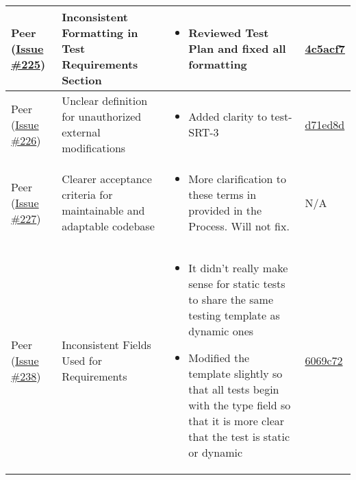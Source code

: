 \documentclass{article}
\begin{document}
\begin{longtable}{|p{2cm}|p{3.5cm}|p{4.5cm}|p{3cm}|}
    Peer (\href{https://github.com/ssm-lab/capstone--source-code-optimizer/issues/225}{Issue \#225}) & 
    Inconsistent Formatting in Test Requirements Section &
    \begin{itemize}[nosep,leftmargin=*]
        \item Reviewed Test Plan and fixed all formatting
    \end{itemize} &
    \href{https://github.com/ssm-lab/capstone--source-code-optimizer/commit/4c5acf71d8f5a05b33241a9b08d3c1c1525a57ae}{4c5acf7} \\
    \hline
    
    Peer (\href{https://github.com/ssm-lab/capstone--source-code-optimizer/issues/226}{Issue \#226}) & 
    Unclear definition for unauthorized external modifications &
    \begin{itemize}[nosep,leftmargin=*]
        \item Added clarity to test-SRT-3
    \end{itemize} &
    \href{https://github.com/ssm-lab/capstone--source-code-optimizer/commit/d71ed8d06018c96abd1e1d932fe8687a835da713}{d71ed8d} \\
    \hline
    
    Peer (\href{https://github.com/ssm-lab/capstone--source-code-optimizer/issues/227}{Issue \#227}) & 
    Clearer acceptance criteria for maintainable and adaptable codebase &
    \begin{itemize}[nosep,leftmargin=*]
        \item More clarification to these terms in provided in the Process. Will not fix.
    \end{itemize} &
    N/A \\
    \hline
    
    Peer (\href{https://github.com/ssm-lab/capstone--source-code-optimizer/issues/238}{Issue \#238}) & 
    Inconsistent Fields Used for Requirements &
    \begin{itemize}[nosep,leftmargin=*]
        \item It didn't really make sense for static tests to share the same testing template as dynamic ones
        \item Modified the template slightly so that all tests begin with the type field so that it is more clear that the test is static or dynamic
    \end{itemize} &
    \href{https://github.com/ssm-lab/capstone--source-code-optimizer/commit/6069c72e491b164f29aeb210f09ef02a9dfd2b78}{6069c72} \\
    \hline
    

\end{longtable}
\end{document}
